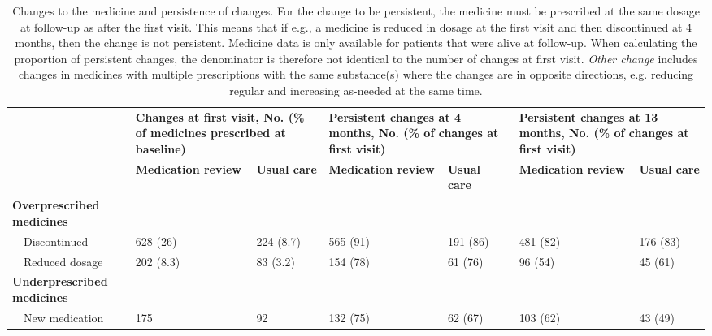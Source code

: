 \begin{table}[!h]
\label{tbl:tbl1}
\caption{Changes to the medicine and persistence of changes. For the change to be persistent, the medicine must be prescribed at the same dosage at follow-up as after the first visit. This means that if e.g., a medicine is reduced in dosage at the first visit and then discontinued at 4 months, then the change is not persistent. Medicine data is only available for patients that were alive at follow-up. When calculating the proportion of persistent changes, the denominator is therefore not identical to the number of changes at first visit. \textit{Other change} includes changes in medicines with multiple prescriptions with the same substance(s) where the changes are in opposite directions, e.g. reducing regular and increasing as-needed at the same time.}
\begin{center}
\begin{tabular}{p{3cm}
                p{2cm}
                p{2cm}
                p{2cm}
                p{2cm}
                p{2cm}
                p{2cm}
}
\toprule
\multirow{2}{*}{} &
  \multicolumn{2}{p{4cm}}{\textbf{Changes at first visit, No. (\% of medicines prescribed at baseline)}} &
  \multicolumn{2}{p{4cm}}{\textbf{Persistent changes at 4   months, No. (\% of changes at first visit)}} &
  \multicolumn{2}{p{4cm}}{\textbf{Persistent changes at 13   months, No. (\% of changes at first visit)}} \\ \cmidrule(l){2-7} 
                                   & \textbf{Medication review} & \textbf{Usual care} & \textbf{Medication review} & \textbf{Usual care} & \textbf{Medication review} & \textbf{Usual care} \\ \cmidrule(r){1-1}
\textbf{Overprescribed medicines}  &                   &            &                   &            &                   &            \\
~~Discontinued                     & 628 (26)          & 224 (8.7)  & 565 (91)          & 191 (86)   & 481 (82)          & 176 (83)   \\
~~Reduced dosage                   & 202 (8.3)         & 83 (3.2)   & 154 (78)          & 61 (76)    & 96 (54)           & 45 (61)    \\
\textbf{Underprescribed medicines} &                   &            &                   &            &                   &            \\
~~New medication                   & 175               & 92         & 132 (75)          & 62 (67)    & 103 (62)          & 43 (49)    \\

\end{tabular}
\end{center}
\end{table}
